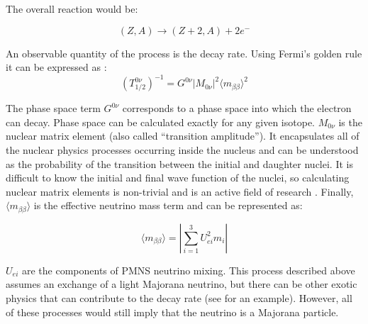The overall reaction would be:

\begin{equation}\label{0nbeta_decay_eq}
(Z,A) \rightarrow (Z+2,A) + 2e^-
\end{equation}

An observable quantity of the process is the decay rate. Using Fermi's golden rule it can be expressed as \cite{mjd2013}:
\begin{equation}\label{0nbbdecay_rate}
(T^{0\nu}_{1/2})^{-1} = G^{0\nu}\left|M_{0\nu}\right|^2\langle m_{\beta\beta}\rangle^2
\end{equation}

The phase space term $G^{0\nu}$ corresponds to a phase space into which the electron can decay. Phase space can be calculated exactly for any given isotope. $M_{0\nu}$ is the nuclear matrix element (also called ``transition amplitude''). It encapsulates all of the nuclear physics processes occurring inside the nucleus and can be understood as the probability of the transition between the initial and daughter nuclei. It is difficult to know the initial and final wave function of the nuclei, so calculating nuclear matrix elements is non-trivial and is an active field of research \cite{Menendez:2017fdf}. Finally, $\langle m_{\beta\beta}\rangle$ is the effective neutrino mass term and can be represented as:

\begin{equation}\label{effective_mjd_mass}
\langle m_{\beta\beta}\rangle =  \left|\sum_{i=1}^{3} U^2_{ei}m_i\right|
\end{equation}

$U_{ei}$ are the components of PMNS neutrino mixing. This process described above assumes an exchange of a light Majorana neutrino, but there can be other exotic physics that can contribute to the decay rate (see \cite{Schechter_1982} for an example). However, all of these processes would still imply that the neutrino is a Majorana particle.

